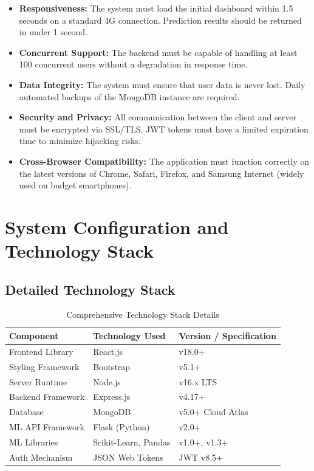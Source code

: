 \documentclass[12pt,a4paper]{report}
\begin{document}
\begin{itemize}
    \item \textbf{Responsiveness:} The system must load the initial dashboard within 1.5 seconds on a standard 4G connection. Prediction results should be returned in under 1 second.
    \item \textbf{Concurrent Support:} The backend must be capable of handling at least 100 concurrent users without a degradation in response time.
    \item \textbf{Data Integrity:} The system must ensure that user data is never lost. Daily automated backups of the MongoDB instance are required.
    \item \textbf{Security and Privacy:} All communication between the client and server must be encrypted via SSL/TLS. JWT tokens must have a limited expiration time to minimize hijacking risks.
    \item \textbf{Cross-Browser Compatibility:} The application must function correctly on the latest versions of Chrome, Safari, Firefox, and Samsung Internet (widely used on budget smartphones).
\end{itemize}

\section{System Configuration and Technology Stack}

\subsection{Detailed Technology Stack}
\begin{table}[H]
    \centering
    \renewcommand{\arraystretch}{1.2}
    \begin{tabularx}{\textwidth}{|p{3cm}|X|p{4cm}|}
        \hline
        \textbf{Component} & \textbf{Technology Used} & \textbf{Version / Specification} \\
        \hline
        Frontend Library & React.js & v18.0+ \\
        \hline
        Styling Framework & Bootstrap & v5.1+ \\
        \hline
        Server Runtime & Node.js & v16.x LTS \\
        \hline
        Backend Framework & Express.js & v4.17+ \\
        \hline
        Database & MongoDB & v5.0+ Cloud Atlas \\
        \hline
        ML API Framework & Flask (Python) & v2.0+ \\
        \hline
        ML Libraries & Scikit-Learn, Pandas & v1.0+, v1.3+ \\
        \hline
        Auth Mechanism & JSON Web Tokens & JWT v8.5+ \\
        \hline
    \end{tabularx}
    \caption{Comprehensive Technology Stack Details}
\end{table}
\end{document}
